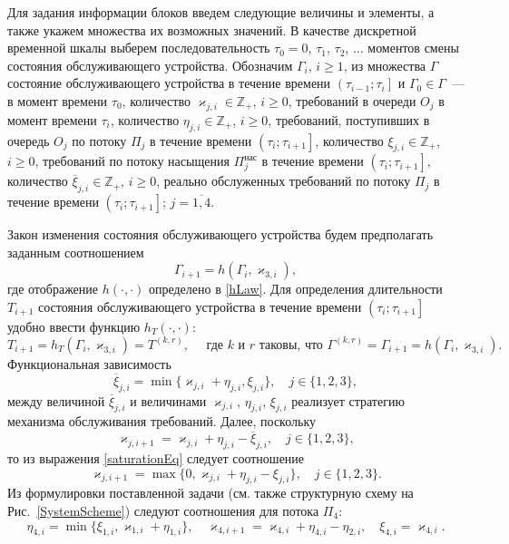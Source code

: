 \documentclass[12pt]{extarticle}
\theoremstyle{theorem}
\theoremstyle{remark}
\begin{document}
Для задания информации блоков введем следующие величины и элементы, а также укажем множества их возможных значений. В качестве дискретной временной шкалы выберем последовательность $\tau_0=0$, $\tau_1$, $\tau_2$, $\ldots$ моментов смены состояния обслуживающего устройства. Обозначим $\Gamma_i$, $i\geqslant 1$, из множества $\Gamma$ состояние обслуживающего устройства в течение времени $\left(\tau_{i-1};\tau_i\right]$ и $\Gamma_0\in \Gamma$~--- в момент времени $\tau_0$, количество $\varkappa_{j,i} \in \mathbb{Z}_+ $, $i\geqslant 0$, требований в очереди $O_j$ в момент времени $\tau_i$, количество $\eta_{j,i} \in \mathbb{Z}_+$, $i\geqslant 0$, требований, поступивших в очередь $O_j$ по потоку $\Pi_j$ в течение времени $\left(\tau_{i};\tau_{i+1}\right]$, количество $\xi_{j,i} \in \mathbb{Z}_+$, $i\geqslant 0$, требований по потоку насыщения $\Pi^{\mathrm{\text{нас}}}_j$ в течение времени $\left(\tau_{i};\tau_{i+1}\right]$, количество $\overline{\xi}_{j,i}\in \mathbb{Z}_+$, $i\geqslant 0$, реально обслуженных требований по потоку $\Pi_j$ в течение времени $\left(\tau_{i};\tau_{i+1}\right]$; $j=\overline{1,4}$.

Закон изменения состояния обслуживающего устройства будем предполагать заданным соотношением 
\begin{equation}
\Gamma_{i+1}=h(\Gamma_i,\varkappa_{3,i}),
\label{gammaFunc}
\end{equation}
где отображение $h(\cdot,\cdot)$ определено в \eqref{hLaw}.
Для определения длительности $T_{i+1}$ состояния обслуживающего устройства в течение времени $\left(\tau_{i};\tau_{i+1}\right]$ удобно ввести функцию $h_T(\cdot,\cdot)$:
\begin{equation*}
T_{i+1}=h_T(\Gamma_i,\varkappa_{3,i})= T^{(k,r)},\quad  \text{ где $k$ и $r$ таковы, что } \Gamma^{(k,r)}=\Gamma_{i+1}=h(\Gamma_i,\varkappa_{3,i}).
\end{equation*}
Функциональная зависимость
\begin{equation}
\overline{\xi}_{j,i}=\min\{\varkappa_{j,i}+\eta_{j,i},\xi_{j,i}\}, \quad j\in \{1,2,3\},
\label{saturationEq}
\end{equation}
между величиной $\overline{\xi}_{j,i}$ и величинами $\varkappa_{j,i}$, $\eta_{j,i}$, $\xi_{j,i}$ реализует стратегию механизма обслуживания требований. Далее, поскольку 
\begin{equation*}
\varkappa_{j,i+1}=\varkappa_{j,i}+\eta_{j,i}-\overline{\xi}_{j,i}, \quad  j\in \{1,2,3\},
\end{equation*}
то из выражения \eqref{saturationEq} следует соотношение
\begin{equation}
\varkappa_{j,i+1}=\max\{{0,\varkappa_{j,i}+\eta_{j,i}-\xi_{j,i}}\}, \quad j\in \{1,2,3\}.
\label{queuesFunc}
\end{equation}
Из формулировки поставленной задачи (см. также структурную схему на Рис.~\ref{SystemScheme}) следуют соотношения для потока $\Pi_4$:
\begin{equation}
\eta_{4,i} = \min\{\xi_{1,i}, \varkappa_{1,i}+\eta_{1,i}\}, \quad \varkappa_{4,i+1}=\varkappa_{4,i}+\eta_{4,i}-\eta_{2,i}, \quad \xi_{4,i} = \varkappa_{4,i}.
\label{FourthFunc}
\end{equation}
\end{document}
